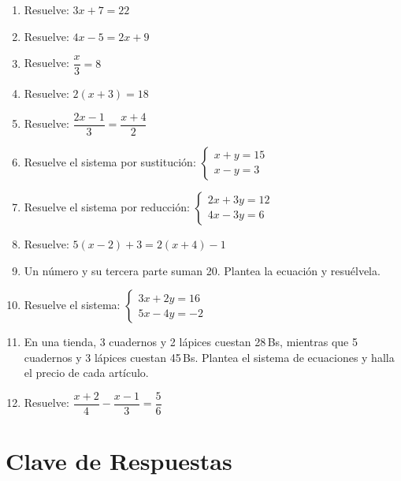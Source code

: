 \documentclass[12pt, a4paper]{article}
\begin{document}
\begin{enumerate}[leftmargin=*, resume]
  \item \facil{} Resuelve: $3x + 7 = 22$

  \item \facil{} Resuelve: $4x - 5 = 2x + 9$

  \item \facil{} Resuelve: $\dfrac{x}{3} = 8$

  \item \facil{} Resuelve: $2(x + 3) = 18$

  \item \medio{} Resuelve: $\dfrac{2x - 1}{3} = \dfrac{x + 4}{2}$

  \item \medio{} Resuelve el sistema por sustitución:
  $\begin{cases} x + y = 15 \\ x - y = 3 \end{cases}$

  \item \medio{} Resuelve el sistema por reducción:
  $\begin{cases} 2x + 3y = 12 \\ 4x - 3y = 6 \end{cases}$

  \item \medio{} Resuelve: $5(x - 2) + 3 = 2(x + 4) - 1$

  \item \dificil{} Un número y su tercera parte suman 20. Plantea la ecuación y resuélvela.

  \item \dificil{} Resuelve el sistema:
  $\begin{cases} 3x + 2y = 16 \\ 5x - 4y = -2 \end{cases}$

  \item \dificil{} En una tienda, 3 cuadernos y 2 lápices cuestan 28\,Bs, mientras que 5 cuadernos y 3 lápices cuestan 45\,Bs. Plantea el sistema de ecuaciones y halla el precio de cada artículo.

  \item \dificil{} Resuelve: $\dfrac{x + 2}{4} - \dfrac{x - 1}{3} = \dfrac{5}{6}$
\end{enumerate}

\newpage

\section{Clave de Respuestas}
\end{document}
